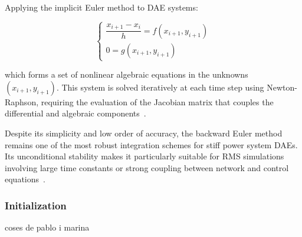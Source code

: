 Applying the implicit Euler method to DAE systems:

\begin{equation}
    \begin{cases}
        \dfrac{x_{i+1} - x_i}{h} = f(x_{i+1}, y_{i+1}) \\
        0 = g(x_{i+1}, y_{i+1})
    \end{cases}
    \label{eq:dae_implicit_step}
\end{equation}

which forms a set of nonlinear algebraic equations in the unknowns $(x_{i+1}, y_{i+1})$. This system is solved iteratively at each time step using Newton-Raphson,
requiring the evaluation of the Jacobian matrix that couples the differential and algebraic components~\cite{Hindmarsh1995}. 

Despite its simplicity and low order of accuracy, the backward Euler method remains one of the most robust integration schemes for stiff power system DAEs.
Its unconditional stability makes it particularly suitable for RMS simulations involving large time constants or strong coupling between network and control equations~\cite{LaraTDS}.


\subsubsection{Initialization}

coses de pablo i marina

